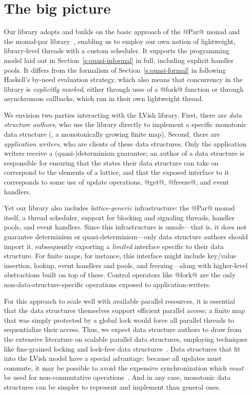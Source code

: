 \section{The big picture}\label{s:lvish-big-picture}

Our library adopts and builds on the basic approach of the @Par@ monad
and the monad-par library~\cite{monad-par}, enabling us to employ our
own notion of lightweight, library-level threads with a custom
scheduler.  It supports the programming model laid out in
Section~\ref{s:quasi-informal} in full, including explicit handler
pools.  It differs from the formalism of Section~\ref{s:quasi-formal}
in following Haskell's by-need evaluation strategy, which also means
that concurrency in the library is \emph{explicitly marked}, either
through uses of a @fork@ function or through asynchronous callbacks,
which run in their own lightweight thread.

We envision two parties interacting with the LVish library.  First,
there are \emph{data structure authors}, who use the library directly
to implement a specific monotonic data structure (\eg, a monotonically
growing finite map).  Second, there are \emph{application writers},
who are clients of these data structures.  Only the application
writers receive a \mbox{(quasi-)determinism} guarantee; an author of a
data structure is responsible for ensuring that the states their data
structure can take on correspond to the elements of a lattice, and
that the exposed interface to it corresponds to some use of update
operations, @get@, @freeze@, and event handlers.

Yet our library also includes
 \emph{lattice-generic}
infrastructure: the @Par@ monad itself, a thread scheduler, support
for blocking and signaling threads, handler pools, and event handlers.
Since this infrastructure is unsafe---that is, it does not guarantee
determinism or quasi-determinism---only data structure authors should
import it, subsequently exporting a \emph{limited} interface specific
to their data structure.  For finite maps, for instance, this
interface might include key/value insertion, lookup, event handlers
and pools, and freezing---along with higher-level abstractions built
on top of these.
%
Control operators like @fork@ are the only non-data-structure-specific
operations exposed to application-writers.

For this approach to scale well with available parallel resources, it
is essential that the data structures themselves support efficient
parallel access; a finite map that was simply protected by a global
lock would force all parallel threads to sequentialize their access.
Thus, we expect data structure authors to draw from the extensive
literature on scalable parallel data structures, employing techniques
like fine-grained locking and lock-free data structures~\cite{art}.
Data structures that fit into the LVish model have a special
advantage: because all updates must commute, it may be possible to
avoid the expensive synchronization which \emph{must} be used for
non-commutative operations~\cite{lawsOfOrder}.  And in any case,
monotonic data structures can be simpler to represent and
implement than general ones. 
